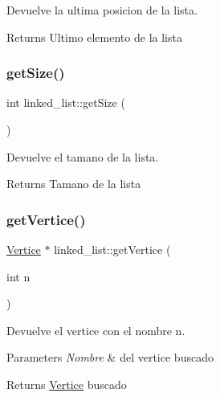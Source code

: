 Devuelve la ultima posicion de la lista. 

\begin{DoxyReturn}{Returns}
Ultimo elemento de la lista 
\end{DoxyReturn}
\mbox{\label{classlinked__list_ab515294f7b7a88568952c35364b6af2c}} 
\subsubsection{\texorpdfstring{get\+Size()}{getSize()}}
{\footnotesize\ttfamily int linked\+\_\+list\+::get\+Size (\begin{DoxyParamCaption}{ }\end{DoxyParamCaption})}



Devuelve el tamano de la lista. 

\begin{DoxyReturn}{Returns}
Tamano de la lista 
\end{DoxyReturn}
\mbox{\label{classlinked__list_a0d08b49a5ce83730678bda38a735ae4e}} 
\subsubsection{\texorpdfstring{get\+Vertice()}{getVertice()}}
{\footnotesize\ttfamily \hyperlink{structVertice}{Vertice} $\ast$ linked\+\_\+list\+::get\+Vertice (\begin{DoxyParamCaption}\item[{int}]{n }\end{DoxyParamCaption})}



Devuelve el vertice con el nombre n. 


\begin{DoxyParams}{Parameters}
{\em Nombre} & del vertice buscado \\
\hline
\end{DoxyParams}
\begin{DoxyReturn}{Returns}
\hyperlink{structVertice}{Vertice} buscado 
\end{DoxyReturn}
\mbox{\label{classlinked__list_aee520e460537321597159722d3817800}} 

